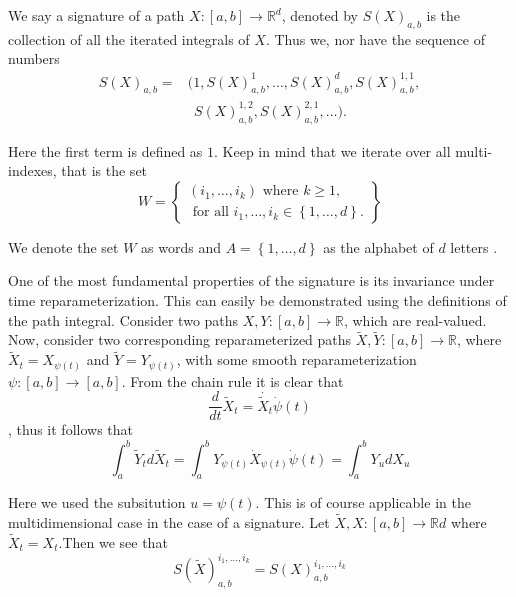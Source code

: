  \begin{definition}[Signature]
     We say a signature of a path $X: \left[ a,b \right] \to  \mathbb{R} ^{d} $, denoted by $S( X) _{a,b}$ is the collection of all the iterated integrals of $X$. Thus we, nor have the sequence of numbers \begin{equation}
     \begin{split}
         S( X) _{a,b}  = & ( 1,  S( X) ^{1}_{a,b}, \ldots, S( X) ^{d}_{a,b}, S( X) ^{1,1}_{a,b}, \\ & \ \  S( X) ^{1,2} _{a,b}, S( X) _{a,b}^{2,1}, \ldots).
     \end{split}
     \end{equation}

     Here the first term is defined as $1$. Keep in mind that we iterate over all multi-indexes, that is the set \begin{equation}
W =\left\{
         \begin{split}
           ( i_{1}, \ldots, i_{k})  \text{ where }  k \ge 1, \\
         \text{ for all } i_{1}, \ldots, i_{k} \in \left\{ 1,\ldots,d \right\} .
         \end{split}
\right\}
     \end{equation}

     We denote the set $W$ as words and $ A = \left\{ 1, \ldots, d \right\} $ as the alphabet of $d $ letters .
 \end{definition}


One of the most fundamental properties of the signature is its invariance under time reparameterization. This can easily be demonstrated using the definitions of the path integral. Consider two paths $X,Y: \left[ a,b \right] \to \mathbb{R}$, which
are real-valued. Now, consider two corresponding reparameterized paths $\widetilde{X}, \widetilde{Y}: \left[ a,b \right] \to \mathbb{R}$, where $\widetilde{X}_{t} = X_{\psi(t)}$ and $\widetilde{Y} = Y_{\psi(t)}$, with some smooth reparameterization $\psi: [a,b]
\to [a,b]$. From the chain rule it is clear that $$\frac{d}{dt} \widetilde{X}_{ t } = \dot{ \widetilde{X}_{ t }}  \dot{ \psi} ( t)  $$, thus it follows that \begin{equation}
    \int_{a}^{b }  \widetilde{Y}_{t} d\widetilde{X}_{t} = \int_{a}^{b}  Y_{\psi ( t) }\dot{X} _{\psi ( t) } \dot{\psi}( t) = \int_{a}^{b}  Y_{u} dX_{u}
\end{equation}

Here we used the subsitution $u = \psi ( t)  $. This is of course applicable in the multidimensional case in the case of a signature. Let $\widetilde{X},X: \left[ a,b \right] \to \mathbb{R} d$ where $\widetilde{X}_{t} = X_{t}$.Then we see that \begin{equation}
    S( \widetilde{X}) _{a,b}^{i_{1},\ldots, i_{k}} = S( X) ^{i_{1},\ldots, i_{k}}_{a,b}
\end{equation}

